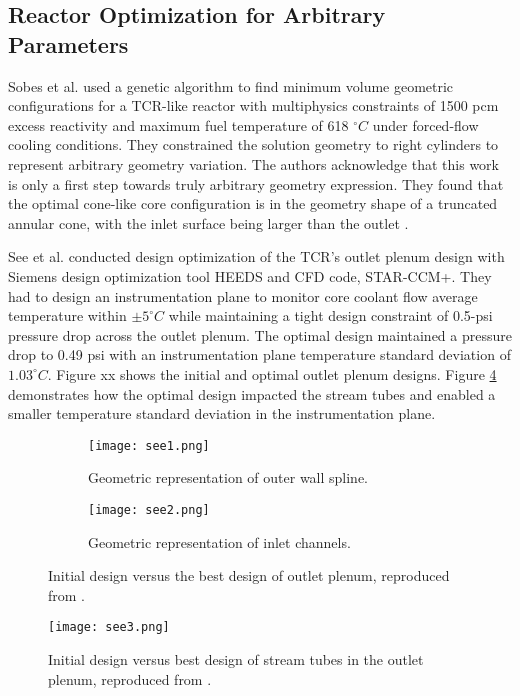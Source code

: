 \subsection{Reactor Optimization for Arbitrary Parameters}
\label{sec:lit-review-reactor-arbitrary}
Sobes et al. \cite{sobes_artificial_2020} used a genetic algorithm to find 
minimum volume geometric configurations for a \gls{TCR}-like reactor with 
multiphysics constraints of 1500 pcm excess reactivity and maximum fuel 
temperature of 618 $^{\circ}C$ under forced-flow cooling conditions. 
They constrained the solution geometry to right cylinders to represent 
arbitrary geometry variation.
The authors acknowledge that this work is only a first step towards truly 
arbitrary geometry expression. 
They found that the optimal cone-like core configuration is in the geometry 
shape of a truncated annular cone, with the inlet surface being larger than 
the outlet \cite{sobes_artificial_2020}.

See et al. \cite{see_design_2022} conducted design optimization of the 
\gls{TCR}'s outlet plenum design with Siemens design optimization tool HEEDS
and \gls{CFD} code, STAR-CCM+. 
They had to design an instrumentation plane to monitor core coolant flow average 
temperature within $\pm 5 ^{\circ}C$ while maintaining a tight design 
constraint of 0.5-psi pressure drop across the outlet plenum.
The optimal design maintained a pressure drop to 0.49 psi with an instrumentation 
plane temperature standard deviation of $1.03^{\circ}C$. 
Figure xx shows the initial and optimal outlet plenum designs. 
Figure \ref{fig:see3} demonstrates how the optimal design impacted the stream 
tubes and enabled a smaller temperature standard deviation in the 
instrumentation plane. 
\begin{figure}[btp]
    \centering
    \begin{subfigure}{0.49\textwidth}
        \texttt{[image: see1.png]}
        \caption{Geometric representation of outer wall spline.}
        \label{fig:see1} 
    \end{subfigure}
    \begin{subfigure}{0.49\textwidth}
        \texttt{[image: see2.png]}
        \caption{Geometric representation of inlet channels.}
        \label{fig:see2} 
    \end{subfigure}
    \caption{Initial design versus the best design of outlet plenum, reproduced 
    from \cite{see_design_2022}.}
\end{figure}
\begin{figure}[btp]
    \centering
    \texttt{[image: see3.png]} 
    \caption{Initial design versus best design of stream tubes in the outlet 
    plenum, reproduced from \cite{see_design_2022}.}
    \label{fig:see3}
\end{figure}

